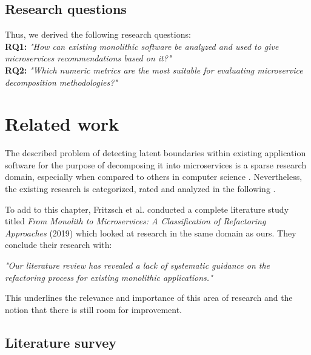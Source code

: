 \documentclass[12pt,a4paper]{report}
\begin{document}
\section{Research questions}

\hangindent=1cm
\noindent Thus, we derived the following research questions:\\
\textbf{RQ1:} \textit{"How can existing monolithic software be analyzed
and used to give microservices recommendations based on it?"}\\
\textbf{RQ2:} \textit{"Which numeric metrics are the most suitable
for evaluating microservice decomposition methodologies?"}




\chapter{Related work} \label{chap:related}

The described problem of detecting latent boundaries within existing
application software for the purpose of decomposing it into microservices is
a sparse research domain, especially when compared to others
in computer science \cite{fritzsch2018monolith}.
Nevertheless, the existing research is categorized, rated and analyzed in the
following \textit{}.

To add to this chapter, Fritzsch et al. conducted a complete literature study titled
\textit{From Monolith to Microservices: A Classification of Refactoring Approaches} (2019)
\cite{fritzsch2018monolith} which looked at research in the same domain as ours.
They conclude their research with:
\begin{displayquote}
\emph{"Our literature review has revealed a lack of systematic guidance on the
refactoring process for existing monolithic applications."}~\cite{fritzsch2018monolith}
\end{displayquote}
This underlines the relevance and importance of this area of research and the
notion that there is still room for improvement.



\section{Literature survey} \label{subsect:literature-survey}
\end{document}
